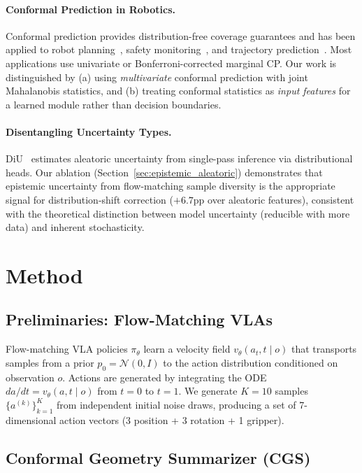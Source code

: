 \documentclass[10pt,letterpaper]{article}
\begin{document}
\paragraph{Conformal Prediction in Robotics.}
Conformal prediction provides distribution-free coverage guarantees and has been applied to robot planning~\cite{cploop}, safety monitoring~\cite{conformalsafety}, and trajectory prediction~\cite{conformaltrajectory}.
Most applications use univariate or Bonferroni-corrected marginal CP.
Our work is distinguished by (a) using \emph{multivariate} conformal prediction with joint Mahalanobis statistics, and (b) treating conformal statistics as \emph{input features} for a learned module rather than decision boundaries.

\paragraph{Disentangling Uncertainty Types.}
DiU~\cite{DiU} estimates aleatoric uncertainty from single-pass inference via distributional heads.
Our ablation (Section~\ref{sec:epistemic_aleatoric}) demonstrates that epistemic uncertainty from flow-matching sample diversity is the appropriate signal for distribution-shift correction ($+6.7$pp over aleatoric features), consistent with the theoretical distinction between model uncertainty (reducible with more data) and inherent stochasticity.

\section{Method}
\label{sec:method}

\subsection{Preliminaries: Flow-Matching VLAs}
\label{sec:prelim}

Flow-matching VLA policies $\pi_\theta$ learn a velocity field $v_\theta(a_t, t \mid o)$ that transports samples from a prior $p_0 = \mathcal{N}(0, I)$ to the action distribution conditioned on observation $o$.
Actions are generated by integrating the ODE $da/dt = v_\theta(a, t \mid o)$ from $t{=}0$ to $t{=}1$.
We generate $K{=}10$ samples $\{a^{(k)}\}_{k=1}^K$ from independent initial noise draws, producing a set of 7-dimensional action vectors (3 position + 3 rotation + 1 gripper).

\subsection{Conformal Geometry Summarizer (CGS)}
\label{sec:cgs}
\end{document}
